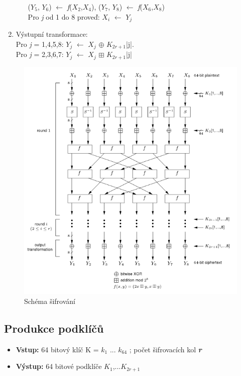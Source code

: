 \documentclass[12pt,a4paper]{article}
\begin{document}
\begin{enumerate}
\begin{enumerate}
($Y_{5}$, $Y_{6}$) $\leftarrow$ \emph{f}($X_{2}$,$X_{4}$), ($Y_{7}$, $Y_{8}$) $\leftarrow$ \emph{f}($X_{6}$,$X_{8}$)\\
Pro \emph{j} od 1 do 8 proveď: $X_{i}$ $\leftarrow$ $Y_{j}$
\end{enumerate}

\item Výstupní transformace:\\
Pro \emph{j} = 1,4,5,8: $Y_{j}$ $\leftarrow$ $X_{j}$ $\oplus$ $K_{2r+1}$|j|.\\
Pro \emph{j} = 2,3,6,7: $Y_{j}$ $\leftarrow$ $X_{j}$ $\boxplus$ $K_{2r+1}$|j|
\end{enumerate}

\begin{figure}
    \center
    \includegraphics[width=165mm]{img/saferschema.png}
    \caption{Schéma šifrování}
\end{figure}


{\subsection{Produkce podklíčů}}
\begin{itemize}
\item \textbf{Vstup:} 64 bitový klíč K = $k_{1}$ ... $k_{64}$ ; počet šifrovacích kol \textbf{\emph{r}}
\item \textbf{Výstup:} 64 bitové podklíče $K_{1}$,...$K_{2r+1}$
\end{itemize}
\end{document}
